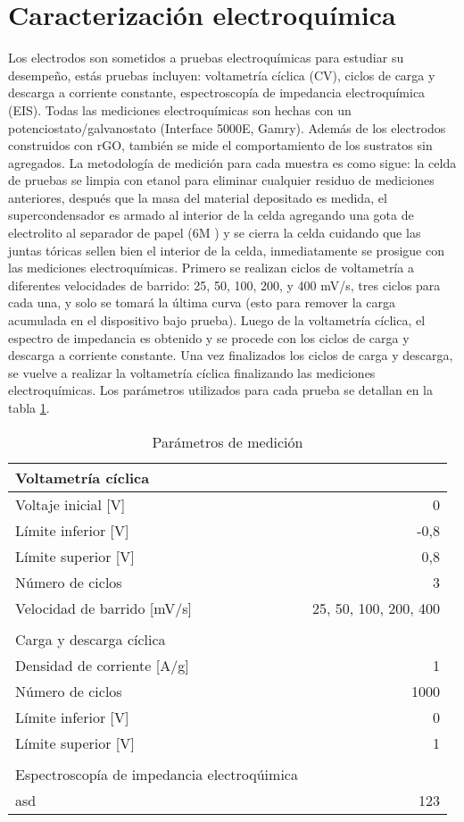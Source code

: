 \section{Caracterización electroquímica}
Los electrodos son sometidos a pruebas electroquímicas para estudiar su desempeño, estás pruebas incluyen: voltametría cíclica (CV), ciclos de carga y descarga a corriente constante, espectroscopía de impedancia electroquímica (EIS). Todas las mediciones electroquímicas son hechas con un potenciostato/galvanostato (Interface 5000E, Gamry). Además de los electrodos construidos con rGO, también se mide el comportamiento de los sustratos sin agregados. La metodología de medición para cada muestra es como sigue: la celda de pruebas se limpia con etanol para eliminar cualquier residuo de mediciones anteriores, después que la masa del material depositado es medida, el supercondensador es armado al interior de la celda agregando una gota de electrolito al separador de papel (6M ) y se cierra la celda cuidando que las juntas tóricas sellen bien el interior de la celda, inmediatamente se prosigue con las mediciones electroquímicas. Primero se realizan ciclos de voltametría a diferentes velocidades de barrido: 25, 50, 100, 200, y 400 mV/s, tres ciclos para cada una, y solo se tomará la última curva (esto para remover la carga acumulada en el dispositivo bajo prueba).  Luego de la voltametría cíclica, el espectro de impedancia es obtenido y se procede con los ciclos de carga y descarga a corriente constante. Una vez finalizados los ciclos de carga y descarga, se vuelve a realizar la voltametría cíclica finalizando las mediciones electroquímicas. Los parámetros utilizados para cada prueba se detallan en la tabla \ref{tab:elec_config}.


\begin{table}[htbp]
	\caption{Parámetros de medición}
	\begin{tabular}{ l r }
		Voltametría cíclica &  \\
		\hline
		Voltaje inicial [V] & 0 \\
		Límite inferior [V] & -0,8 \\
		Límite superior [V] & 0,8  \\
		Número de ciclos & 3 \\
		Velocidad de barrido [mV/s] & 25, 50, 100, 200, 400 \\
		& \\
		Carga y descarga cíclica & \\
		\hline
		Densidad de corriente [A/g] & 1 \\
		Número de ciclos & 1000 \\
		Límite inferior [V] & 0 \\
		Límite superior [V] & 1 \\
		& \\
		Espectroscopía de impedancia electroqúimica & \\
		\hline
		asd & 123 \\
	\end{tabular}
	\label{tab:elec_config}
\end{table}

